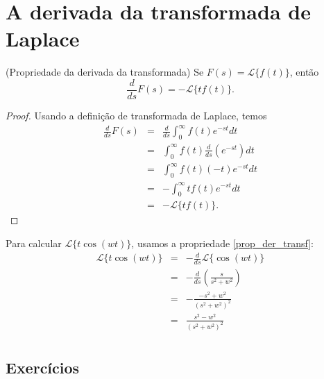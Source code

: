 \section{A derivada da transformada de Laplace}
\begin{teo}{\label{prop_der_transf}}(Propriedade da derivada da transformada)
Se $F(s)=\mathcal{L}\{f(t)\}$, então
\begin{equation}
\frac{d}{ds}F(s)=-\mathcal{L}\{tf(t)\}.
\end{equation} 
\end{teo}
\begin{proof}
Usando a definição de transformada de Laplace, temos
\begin{eqnarray*}
\frac{d}{ds}F(s)&=&\frac{d}{ds}\int_0^\infty f(t) e^{-st}dt\\
&=&\int_0^\infty f(t) \frac{d}{ds}\left(e^{-st}\right)dt\\
&=&\int_0^\infty f(t) (-t)e^{-st}dt\\
&=&-\int_0^\infty tf(t) e^{-st}dt\\
&=&-\mathcal{L}\{tf(t)\}.
\end{eqnarray*}
\end{proof}
\begin{ex}Para calcular $\mathcal{L}\{t\cos(wt)\}$, usamos a propriedade \ref{prop_der_transf}:
\begin{eqnarray*}
\mathcal{L}\{t\cos(wt)\}&=&-\frac{d}{ds}\mathcal{L}\{\cos(wt)\}\\
&=&-\frac{d}{ds}\left(\frac{s}{s^2+w^2}\right)\\
&=&-\frac{-s^2+w^2}{(s^2+w^2)^2}\\
&=&\frac{s^2-w^2}{(s^2+w^2)^2}\\
\end{eqnarray*}
\end{ex}

\subsection*{Exercícios}%


